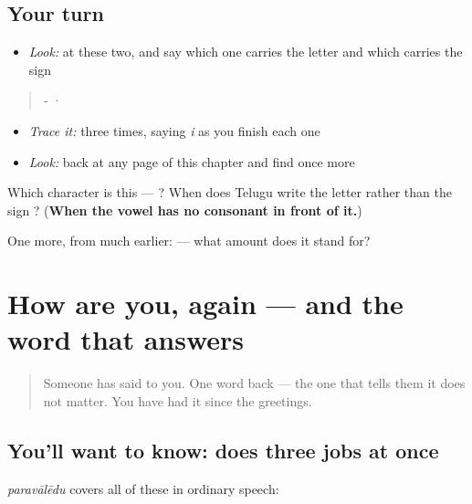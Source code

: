 \subsection*{Your turn}
\begin{itemize}
\raggedright
  \item \emph{Look:} at these two, and say which one carries the letter  and which carries the sign 
\end{itemize}

\begin{quote}
‑  ·  
\end{quote}

\begin{itemize}
\raggedright
  \item \emph{Trace it:}  three times, saying \emph{i} as you finish each one
  \item \emph{Look:} back at any page of this chapter and find  once more
\end{itemize}

\begin{tcolorbox}[breakable,colback=teal!4,colframe=teal!35!black,title={Before you move on}]
Which character is this — ? When does Telugu write the letter  rather than the sign ? (\textbf{When the vowel has no consonant in front of it.})

One more, from much earlier:  — what amount does it stand for?
\end{tcolorbox}
\section[(dialogue)]{How are you, again — and the word that answers }

\label{lesson:TE-C09-second-pass-wellbeing}



\begin{quote}
Someone has said \textbf{} to you. One word back — the one that tells them it does not matter. You have had it since the greetings.
\end{quote}

\subsection*{You'll want to know:  does three jobs at once}
\textbf{} \emph{paravālēdu} covers all of these in ordinary speech:

